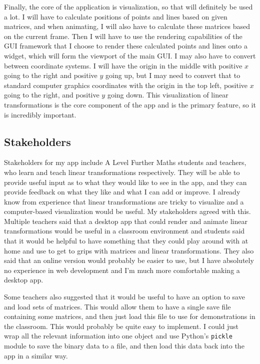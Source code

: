 \documentclass[../main.tex]{subfiles}
\begin{document}
Finally, the core of the application is visualization, so that will definitely be used a lot. I will have to calculate positions of points and lines based on given matrices, and when animating, I will also have to calculate these matrices based on the current frame. Then I will have to use the rendering capabilities of the GUI framework that I choose to render these calculated points and lines onto a widget, which will form the viewport of the main GUI. I may also have to convert between coordinate systems. I will have the origin in the middle with positive $x$ going to the right and positive $y$ going up, but I may need to convert that to standard computer graphics coordinates with the origin in the top left, positive $x$ going to the right, and positive $y$ going down. This visualization of linear transformations is the core component of the app and is the primary feature, so it is incredibly important.

\subsection{Stakeholders\label{analysis:stakeholders}}

Stakeholders for my app include A Level Further Maths students and teachers, who learn and teach linear transformations respectively. They will be able to provide useful input as to what they would like to see in the app, and they can provide feedback on what they like and what I can add or improve. I already know from experience that linear transformations are tricky to visualize and a computer-based visualization would be useful. My stakeholders agreed with this. Multiple teachers said that a desktop app that could render and animate linear transformations would be useful in a classroom environment and students said that it would be helpful to have something that they could play around with at home and use to get to grips with matrices and linear transformations. They also said that an online version would probably be easier to use, but I have absolutely no experience in web development and I'm much more comfortable making a desktop app.

Some teachers also suggested that it would be useful to have an option to save and load sets of matrices. This would allow them to have a single save file containing some matrices, and then just load this file to use for demonstrations in the classroom. This would probably be quite easy to implement. I could just wrap all the relevant information into one object and use Python's \texttt{pickle} module to save the binary data to a file, and then load this data back into the app in a similar way.
\end{document}
